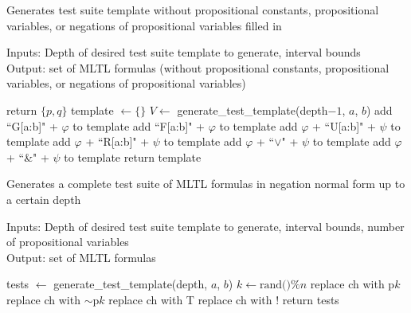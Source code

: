 \documentclass[runningheads]{llncs}
\renewcommand{\phi}{\varphi}
\begin{document}
\begin{algorithm}[H]
    \caption{Generates test suite template without propositional constants, propositional variables, or negations of propositional variables filled in}
    Inputs: Depth of desired test suite template to generate, interval bounds\\
    Output: set of MLTL formulas (without propositional constants, propositional variables, or negations of propositional variables)
    \begin{algorithmic}
         return $\{p, q\}$
        \EndIf
        \State template $\leftarrow \{\}$
        \State $V \leftarrow$ generate\_test\_template(depth$- 1$, $a$, $b$)
        \For{(string $\phi \in V$)}
            \State add ``G[a:b]" + $\phi$ to template
            \State add ``F[a:b]" + $\phi$ to template
                \State add $\phi$ + ``U[a:b]" + $\psi$ to template
                \State add  $\phi$ + ``R[a:b]" + $\psi$ to template
                \State add $\phi$ + ``$\lor$" + $\psi$ to template
                \State add $\phi$ + ``\&" + $\psi$ to template
            \EndFor
        \EndFor
        \State return template
    \EndProcedure
    \end{algorithmic}
    
\end{algorithm}
\begin{algorithm}[H]
    \caption{Generates a complete test suite of MLTL formulas in negation normal form up to a certain depth}
    Inputs: Depth of desired test suite template to generate, interval bounds, number of propositional variables\\
    Output: set of MLTL formulas
    \begin{algorithmic}
        \State tests $\leftarrow$ generate\_test\_template(depth, $a$, $b$) 
                    \State $k \leftarrow \text{rand()} \% n$ 
                     replace ch with p$k$
                    \Else \hspace{1mm}replace ch with $\scriptstyle{\sim}$p$k$
                    \EndIf
                     replace ch with T
                    \Else \hspace{1mm}replace ch with $!$
                    \EndIf
                \EndIf
            \EndFor
        \EndFor
    \State return tests
    \EndProcedure
    \end{algorithmic}
\end{algorithm}
\end{document}
